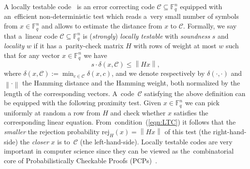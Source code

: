 \documentclass[11pt]{article}
\let\le\leqslant
\theoremstyle{plain}
\theoremstyle{definition}
\theoremstyle{remark}
\newcommand{\norm}[1]{\left\lVert#1\right\rVert}
\newcommand{\cC}{\mathcal{C}}
\newcommand{\F}{\mathbb{F}}
\begin{document}
A locally testable code~\cite{LTC:2006} is an error correcting code $\cC\subseteq \F_q^n$ equipped with an~efficient non-deterministic test which reads a~very small number of symbols from $x\in\F_q^n$ and allows to estimate the  distance from $x$ to $\cC$. Formally, we say that a~linear code $\cC\subseteq \F_q^n$ is (\emph{strongly}) \emph{locally testable} with \emph{soundness} $s$ and \emph{locality} $w$  if it has a~parity-check matrix $H$ with rows of weight at most $w$ such that for any vector $x \in \mathbb{F}_q^n$ we have
\begin{equation}\label{eqn:LTC}
   s \cdot \delta(x, \mathcal{C}) \le  \norm{H x}, 
\end{equation}
where $\delta(x, \mathcal{C}) := \min_{c\in\cC} \delta(x,c)$, and we denote respectively by $\delta(\cdot,\cdot)$ and $\norm{\cdot}$ the Hamming distance and the Hamming weight, both normalized by the length of the corresponding vectors. A~code~$\cC$ satisfying the above definition can be equipped with the following proximity test. Given $x\in \F_q^n$ we can pick uniformly at random a row from $H$ and check whether $x$ satisfies the corresponding linear equation. From~condition~(\ref{eqn:LTC}) it follows that the \emph{smaller} the rejection probability $\mathrm{rej}_H(x) = \norm{Hx}$ of this test (the right-hand-side) the \emph{closer} $x$ is to~$\cC$ (the left-hand-side).
Locally testable codes are very important in computer science since they can be viewed as the~combinatorial core of Probabilistically Checkable Proofs (PCPs)~\cite{LTC:2006, Dinur:2006}. 
\end{document}
